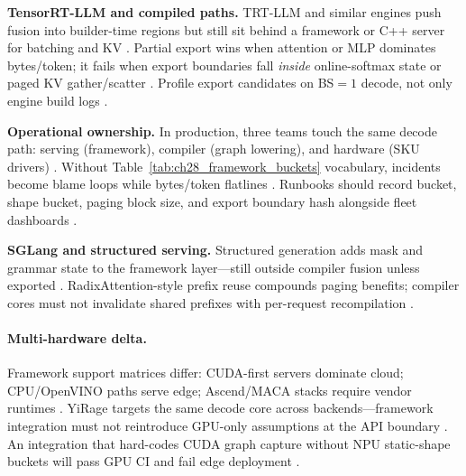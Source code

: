 \textbf{TensorRT-LLM and compiled paths.} TRT-LLM and similar engines push fusion into builder-time regions but still sit behind a framework or C++ server for batching and KV \citep{patel2025llminference,nvidia2024cudagraphs,dlbook}. Partial export wins when attention or MLP dominates bytes/token; it fails when export boundaries fall \emph{inside} online-softmax state or paged KV gather/scatter \citep{dao2022flashattention,dao2023flashdecoding,kwon2023vllm,memoryfloor2026,yirage2026}. Profile export candidates on BS${=}1$ decode, not only engine build logs \citep{taxbreak2026,patel2025llminference,memoryfloor2026}.

\textbf{Operational ownership.} In production, three teams touch the same decode path: serving (framework), compiler (graph lowering), and hardware (SKU drivers) \citep{patel2025llminference,chen2020compilerbasedhardw,yirage2026,dlbook,kwon2023vllm,taxbreak2026,memoryfloor2026,amd2024xdna,amd2024aie,liu2024deepseekv3,nvidia2024cudagraphs,dao2022flashattention,semianalysis2024tma}. Without Table~\ref{tab:ch28_framework_buckets} vocabulary, incidents become blame loops while bytes/token flatlines \citep{kwon2023vllm,patel2025llminference,taxbreak2026,memoryfloor2026,yirage2026,chen2020compilerbasedhardw,dlbook}. Runbooks should record bucket, shape bucket, paging block size, and export boundary hash alongside fleet dashboards \citep{patel2025llminference,memoryfloor2026,taxbreak2026,yirage2026,chen2020compilerbasedhardw,kwon2023vllm,nvidia2024cudagraphs,dao2022flashattention,dlbook}.

\textbf{SGLang and structured serving.} Structured generation adds mask and grammar state to the framework layer---still outside compiler fusion unless exported \citep{patel2025llminference,kwon2023vllm,dlbook,yirage2026,chen2020compilerbasedhardw,taxbreak2026,memoryfloor2026,liu2024deepseekv3,nvidia2024cudagraphs,dao2022flashattention,semianalysis2024tma,amd2024xdna,amd2024aie,dlbook}. RadixAttention-style prefix reuse compounds paging benefits; compiler cores must not invalidate shared prefixes with per-request recompilation \citep{patel2025llminference,kwon2023vllm,yirage2026,chen2020compilerbasedhardw,memoryfloor2026,taxbreak2026,dlbook}.

\paragraph{Multi-hardware delta.} Framework support matrices differ: CUDA-first servers dominate cloud; CPU/OpenVINO paths serve edge; Ascend/MACA stacks require vendor runtimes \citep{amd2024aie,amd2024xdna,patel2025llminference,yirage2026,chen2020compilerbasedhardw,dlbook}. YiRage targets the same decode core across backends---framework integration must not reintroduce GPU-only assumptions at the API boundary \citep{yirage2026,chen2020compilerbasedhardw,amd2024xdna,amd2024aie,liu2024deepseekv3,kwon2023vllm,taxbreak2026,memoryfloor2026,semianalysis2024tma,dao2022flashattention,dao2023flashdecoding,nvidia2022hopper,nvidia2024cudagraphs}. An integration that hard-codes CUDA graph capture without NPU static-shape buckets will pass GPU CI and fail edge deployment \citep{amd2024aie,chen2020compilerbasedhardw,yirage2026}.

